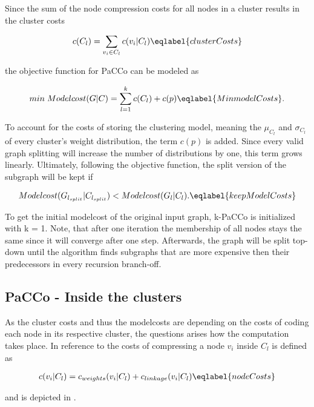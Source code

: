 \documentclass[12pt,journal,compsoc]{IEEEtran}
\numberwithin{equation}{section}
\begin{document}
Since the sum of the node compression costs for all nodes in a cluster results in the cluster costs

	\begin{align}
		c(C_{l})=\sum_{v_{i}\in C_{l}}c(v_{i}|C_{l})
		\eqlabel{clusterCosts}
	\end{align}
	
 the objective function for PaCCo can be modeled as
 
	\begin{align}
		min \; Modelcost(G|C)=\sum_{l=1}^{k}c(C_{l})+c(p)
		\eqlabel{MinmodelCosts}.
	\end{align}
	
To account for the costs of storing the clustering model, meaning the $ \mu_{C_{l}} $ and $ \sigma_{C_{l}} $ of every cluster's weight distribution, the term $ c(p) $ is added. Since every valid graph splitting will increase the number of distributions by one, this term grows linearly.
Ultimately, following the objective function, the split version of the subgraph will be kept if

	\begin{align}
		Modelcost(G_{l_{split}}|C_{l_{split}}) < Modelcost(G_{l}|C_{l}).
	\eqlabel{keepModelCosts}
	\end{align}
	
To get the initial modelcost of the original input graph, k-PaCCo is initialized with k = 1. Note, that after one iteration the membership of all nodes stays the same since it will converge after one step.
Afterwards, the graph will be split top-down until the algorithm finds  subgraphs that are more expensive then their predecessors in every recursion branch-off. 

\subsection{PaCCo - Inside the clusters}
\label{sec:insideClusters}
As the cluster costs and thus the modelcosts are depending on the costs of coding each node in its respective cluster, the questions arises how the computation takes place. 
In reference to \cite{mueller2011weighted} the costs of compressing a node $ v_{i} $ inside $ C_{l}$ is defined as

	\begin{align}
		c(v_{i}|C_{l})=c_{weights}(v_{i}|C_{l})+c_{linkage}(v_{i}|C_{l})
		\eqlabel{nodeCosts}
	\end{align}

and is depicted in .
\end{document}
